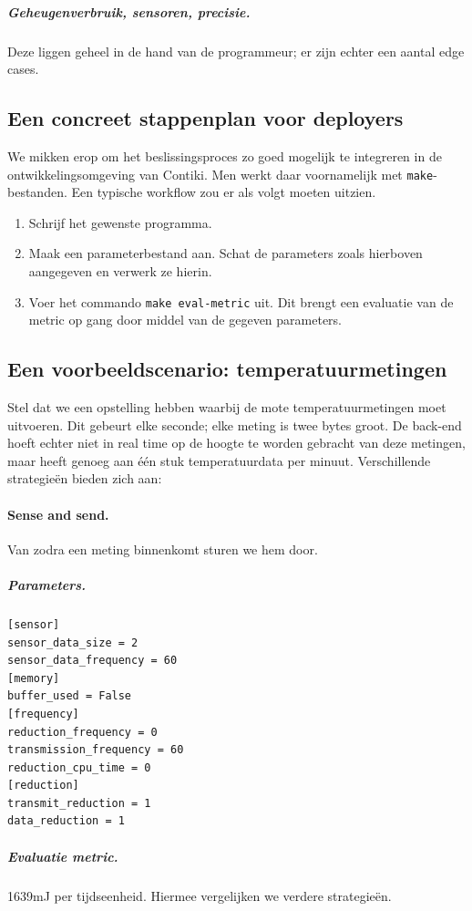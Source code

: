 \documentclass{article}
\begin{document}
\subparagraph{Geheugenverbruik, sensoren, precisie.} Deze liggen geheel in de
hand van de programmeur; er zijn echter een aantal edge cases. 

\subsection{Een concreet stappenplan voor deployers}
We mikken erop om het beslissingsproces zo goed mogelijk te integreren in
de ontwikkelingsomgeving van Contiki. Men werkt daar voornamelijk met
\texttt{make}-bestanden. Een typische workflow zou er als volgt moeten uitzien.

\begin{enumerate}
\item Schrijf het gewenste programma.
\item Maak een parameterbestand aan. Schat de parameters zoals hierboven
aangegeven en verwerk ze hierin.
\item Voer het commando \texttt{make eval-metric} uit. Dit brengt een evaluatie
van de metric op gang door middel van de gegeven parameters.
\end{enumerate}

\subsection{Een voorbeeldscenario: temperatuurmetingen}

Stel dat we een opstelling hebben waarbij de mote temperatuurmetingen moet
uitvoeren. Dit gebeurt elke seconde; elke meting is twee bytes groot. De
back-end hoeft echter niet in real time op de hoogte te worden gebracht van deze
metingen, maar heeft genoeg aan \'e\'en stuk temperatuurdata per
minuut. Verschillende strategie\"en bieden zich aan:

\paragraph{Sense and send.} Van zodra een meting binnenkomt sturen we hem door.

\subparagraph{Parameters.} 

\begin{verbatim}
[sensor]
sensor_data_size = 2
sensor_data_frequency = 60
[memory]
buffer_used = False
[frequency]
reduction_frequency = 0
transmission_frequency = 60
reduction_cpu_time = 0
[reduction]
transmit_reduction = 1
data_reduction = 1
\end{verbatim}

\subparagraph{Evaluatie metric.} 1639mJ per tijdseenheid. Hiermee vergelijken we verdere strategie\"en.
\end{document}
